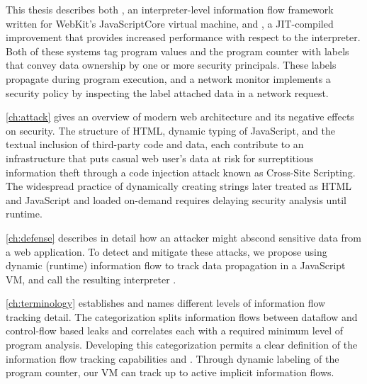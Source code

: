 This thesis describes both \FlowCore, an interpreter-level information flow framework written for WebKit's JavaScriptCore virtual machine, and \JitFlow, a JIT-compiled improvement that provides increased performance with respect to the interpreter.
Both of these systems tag program values and the program counter with labels that convey data ownership by one or more security principals.
These labels propagate during program execution, and a network monitor implements a security policy by inspecting the label attached data in a network request.


\autoref{ch:attack} gives an overview of modern web architecture and its negative effects on security.
The structure of HTML, dynamic typing of JavaScript, and the textual inclusion of third-party code and data, each contribute to an infrastructure that puts casual web user's data at risk for surreptitious information theft through a code injection attack known as Cross-Site Scripting.
The widespread practice of dynamically creating strings later treated as HTML and JavaScript and loaded on-demand requires delaying security analysis until runtime.

\autoref{ch:defense} describes in detail how an attacker might abscond sensitive data from a web application.
To detect and mitigate these attacks, we propose using dynamic (runtime) information flow to track data propagation in a JavaScript VM, and call the resulting interpreter \FlowCore.

\autoref{ch:terminology} establishes and names different levels of information flow tracking detail.
The categorization splits information flows between dataflow and control-flow based leaks and correlates each with a required minimum level of program analysis.
Developing this categorization permits a clear definition of the information flow tracking capabilities \FlowCore and \JitFlow.
Through dynamic labeling of the program counter, our VM can track up to active implicit information flows.

